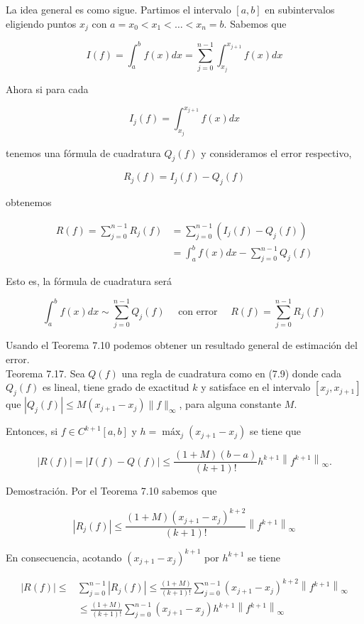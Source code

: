 \documentclass[10pt]{article}
\begin{document}
La idea general es como sigue. Partimos el intervalo $[a, b]$ en subintervalos eligiendo puntos $x_{j}$ con $a=x_{0}<x_{1}<\ldots<x_{n}=b$. Sabemos que

$$
I(f)=\int_{a}^{b} f(x) d x=\sum_{j=0}^{n-1} \int_{x_{j}}^{x_{j+1}} f(x) d x
$$

Ahora si para cada

$$
I_{j}(f)=\int_{x_{j}}^{x_{j+1}} f(x) d x
$$

tenemos una fórmula de cuadratura $Q_{j}(f)$ y consideramos el error respectivo,

$$
R_{j}(f)=I_{j}(f)-Q_{j}(f)
$$

obtenemos

$$
\begin{aligned}
R(f)=\sum_{j=0}^{n-1} R_{j}(f) & =\sum_{j=0}^{n-1}\left(I_{j}(f)-Q_{j}(f)\right) \\
& =\int_{a}^{b} f(x) d x-\sum_{j=0}^{n-1} Q_{j}(f)
\end{aligned}
$$

Esto es, la fórmula de cuadratura será


\begin{equation*}
\int_{a}^{b} f(x) d x \sim \sum_{j=0}^{n-1} Q_{j}(f) \quad \text { con error } \quad R(f)=\sum_{j=0}^{n-1} R_{j}(f) \tag{7.9}
\end{equation*}


Usando el Teorema 7.10 podemos obtener un resultado general de estimación del error.\\
Teorema 7.17. Sea $Q(f)$ una regla de cuadratura como en (7.9) donde cada $Q_{j}(f)$ es lineal, tiene grado de exactitud $k$ y satisface en el intervalo $\left[x_{j}, x_{j+1}\right]$ que $\left|Q_{j}(f)\right| \leq M\left(x_{j+1}-x_{j}\right)\|f\|_{\infty}$, para alguna constante $M$.

Entonces, si $f \in C^{k+1}[a, b]$ y $h=\operatorname{máx}_{j}\left(x_{j+1}-x_{j}\right)$ se tiene que

$$
|R(f)|=|I(f)-Q(f)| \leq \frac{(1+M)(b-a)}{(k+1)!} h^{k+1}\left\|f^{k+1}\right\|_{\infty} .
$$

Demostración. Por el Teorema 7.10 sabemos que

$$
\left|R_{j}(f)\right| \leq \frac{(1+M)\left(x_{j+1}-x_{j}\right)^{k+2}}{(k+1)!}\left\|f^{k+1}\right\|_{\infty}
$$

En consecuencia, acotando $\left(x_{j+1}-x_{j}\right)^{k+1}$ por $h^{k+1}$ se tiene

$$
\begin{aligned}
|R(f)| \leq & \sum_{j=0}^{n-1}\left|R_{j}(f)\right| \leq \frac{(1+M)}{(k+1)!} \sum_{j=0}^{n-1}\left(x_{j+1}-x_{j}\right)^{k+2}\left\|f^{k+1}\right\|_{\infty} \\
& \leq \frac{(1+M)}{(k+1)!} \sum_{j=0}^{n-1}\left(x_{j+1}-x_{j}\right) h^{k+1}\left\|f^{k+1}\right\|_{\infty}
\end{aligned}
$$
\end{document}

